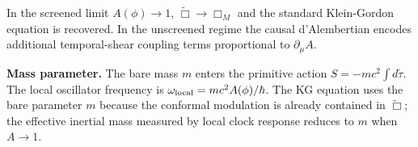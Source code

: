 \documentclass{article}
\begin{document}
In the screened limit $A(\phi)\to 1$, $\tilde{\Box}\to\Box_M$ and the
standard Klein-Gordon equation is recovered.  In the unscreened regime
the causal d'Alembertian encodes additional temporal-shear coupling
terms proportional to $\partial_\mu A$.

\textbf{Mass parameter.}  The bare mass $m$ enters the primitive action
$S = -mc^2\int d\tilde{\tau}$.  The local oscillator frequency is
$\omega_{\rm local} = mc^2 A(\phi)/\hbar$.  The KG equation uses the
bare parameter $m$ because the conformal modulation is already
contained in $\tilde{\Box}$; the effective inertial mass measured by
local clock response reduces to $m$ when $A\to 1$.
\end{document}
